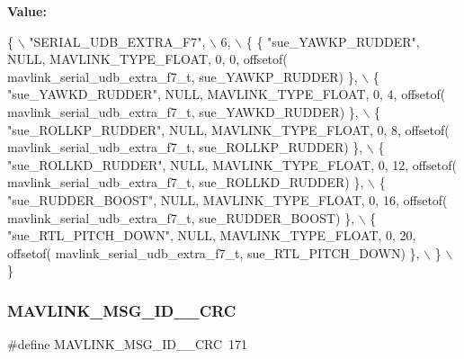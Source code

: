 {\bfseries Value\+:}
\begin{DoxyCode}
\{ \(\backslash\)
    \textcolor{stringliteral}{"SERIAL\_UDB\_EXTRA\_F7"}, \(\backslash\)
    6, \(\backslash\)
    \{  \{ \textcolor{stringliteral}{"sue\_YAWKP\_RUDDER"}, NULL, MAVLINK_TYPE_FLOAT, 0, 0, offsetof(
      mavlink_serial_udb_extra_f7_t, sue\_YAWKP\_RUDDER) \}, \(\backslash\)
         \{ \textcolor{stringliteral}{"sue\_YAWKD\_RUDDER"}, NULL, MAVLINK_TYPE_FLOAT, 0, 4, offsetof(
      mavlink_serial_udb_extra_f7_t, sue\_YAWKD\_RUDDER) \}, \(\backslash\)
         \{ \textcolor{stringliteral}{"sue\_ROLLKP\_RUDDER"}, NULL, MAVLINK_TYPE_FLOAT, 0, 8, offsetof(
      mavlink_serial_udb_extra_f7_t, sue\_ROLLKP\_RUDDER) \}, \(\backslash\)
         \{ \textcolor{stringliteral}{"sue\_ROLLKD\_RUDDER"}, NULL, MAVLINK_TYPE_FLOAT, 0, 12, offsetof(
      mavlink_serial_udb_extra_f7_t, sue\_ROLLKD\_RUDDER) \}, \(\backslash\)
         \{ \textcolor{stringliteral}{"sue\_RUDDER\_BOOST"}, NULL, MAVLINK_TYPE_FLOAT, 0, 16, offsetof(
      mavlink_serial_udb_extra_f7_t, sue\_RUDDER\_BOOST) \}, \(\backslash\)
         \{ \textcolor{stringliteral}{"sue\_RTL\_PITCH\_DOWN"}, NULL, MAVLINK_TYPE_FLOAT, 0, 20, offsetof(
      mavlink_serial_udb_extra_f7_t, sue\_RTL\_PITCH\_DOWN) \}, \(\backslash\)
         \} \(\backslash\)
\}
\end{DoxyCode}
\mbox{\label{mavlink__msg__serial__udb__extra__f7_8h_ad772ef972625c32486f1992071ee87bc}} 
\subsubsection{M\+A\+V\+L\+I\+N\+K\+\_\+\+M\+S\+G\+\_\+\+I\+D\+\_\+\_\+\+C\+RC}
{\footnotesize\ttfamily \#define M\+A\+V\+L\+I\+N\+K\+\_\+\+M\+S\+G\+\_\+\+I\+D\+\_\+\_\+\+C\+RC~171}

\mbox{\label{mavlink__msg__serial__udb__extra__f7_8h_a53ff4628b34e8beeb45df126fc2d01fd}} 
